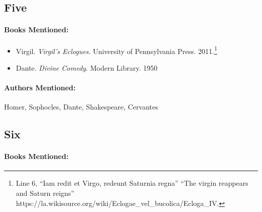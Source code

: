 \documentclass[12pt]{article}
\providecommand{\tightlist}{%
  \setlength{\itemsep}{0pt}\setlength{\parskip}{0pt}}
\begin{document}
\subsection{Five}\label{five}

\paragraph{Books Mentioned:}\label{books-mentioned-6}

\begin{itemize}
\tightlist
\item
  Virgil. \emph{Virgil's Eclogues}. University of Pennsylvania Press. 2011.\footnote{Line 6, ``Iam redit et Virgo, redeunt Saturnia regna'' ``The virgin reappears and Saturn reigns'' https://la.wikisource.org/wiki/Eclogae\_vel\_bucolica/Ecloga\_IV.}
\item
  Dante. \emph{Divine Comedy}. Modern Library. 1950
\end{itemize}

\paragraph{Authors Mentioned:}\label{authors-mentioned-3}

Homer, Sophocles, Dante, Shakespeare, Cervantes

\subsection{Six}\label{six}

\paragraph{Books Mentioned:}\label{books-mentioned-7}
\end{document}
